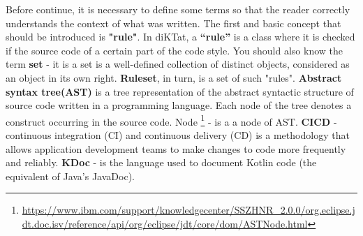 Before continue, it is necessary to define some terms so that the reader correctly understands the context of what was written. The first and basic concept that should be introduced is \textbf{"rule"}. In diKTat, a \textbf{“rule”} is a class where it is checked if the source code of a certain part of the code style. You should also know the term \textbf{set} - it is a set is a well-defined collection of distinct objects, considered as an object in its own right. \textbf{Ruleset}, in turn, is a set of such "rules". \textbf{Abstract syntax tree(AST)} is a tree representation of the abstract syntactic structure of source code written in a programming language. Each node of the tree denotes a construct occurring in the source code. Node \footnote{\url{ https://www.ibm.com/support/knowledgecenter/SSZHNR_2.0.0/org.eclipse.jdt.doc.isv/reference/api/org/eclipse/jdt/core/dom/ASTNode.html}} - is a a node of AST. \textbf{CICD} - continuous integration (CI) and continuous delivery (CD) is a methodology that allows application development teams to make changes to code more frequently and reliably. \textbf{KDoc} - is the language used to document Kotlin code (the equivalent of Java's JavaDoc).